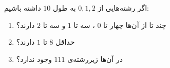 \EXERCISE
اگر رشته‌هایی از
$0, 1, 2$
به طول
$10$
داشته باشیم:
\begin{enumerate}
\item
چند تا از آن‌ها چهار تا
$0$
، سه تا
$1$
و سه تا
$2$
دارند؟
\item
حداقل
$8$
تا
$1$
دارند؟
\item
در آن‌ها زیررشته‌ی
$111$
وجود ندارد؟
\end{enumerate}